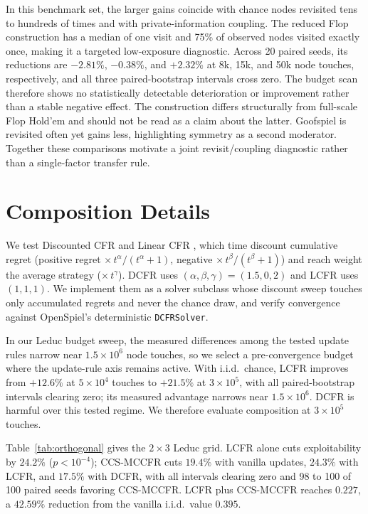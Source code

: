 \documentclass[11pt]{article}
\begin{document}
In this benchmark set, the larger gains coincide with chance nodes revisited tens to hundreds of times and with private-information coupling. The reduced Flop construction has a median of one visit and 75\% of observed nodes visited exactly once, making it a targeted low-exposure diagnostic. Across 20 paired seeds, its reductions are $-2.81\%$, $-0.38\%$, and $+2.32\%$ at 8k, 15k, and 50k node touches, respectively, and all three paired-bootstrap intervals cross zero. The budget scan therefore shows no statistically detectable deterioration or improvement rather than a stable negative effect. The construction differs structurally from full-scale Flop Hold'em and should not be read as a claim about the latter. Goofspiel is revisited often yet gains less, highlighting symmetry as a second moderator. Together these comparisons motivate a joint revisit/coupling diagnostic rather than a single-factor transfer rule.

\section{Composition Details}
\label{app:composition-details}

We test Discounted CFR and Linear CFR \citep{brown2019solving}, which time discount cumulative regret (positive regret $\times\, t^\alpha/(t^\alpha{+}1)$, negative $\times\, t^\beta/(t^\beta{+}1)$) and reach weight the average strategy ($\times\, t^\gamma$). DCFR uses $(\alpha,\beta,\gamma){=}(1.5,0,2)$ and LCFR uses $(1,1,1)$. We implement them as a solver subclass whose discount sweep touches only accumulated regrets and never the chance draw, and verify convergence against OpenSpiel's deterministic \texttt{DCFRSolver}.

In our Leduc budget sweep, the measured differences among the tested update rules narrow near $1.5\!\times\!10^6$ node touches, so we select a pre-convergence budget where the update-rule axis remains active. With i.i.d.\ chance, LCFR improves from $+12.6\%$ at $5\!\times\!10^4$ touches to $+21.5\%$ at $3\!\times\!10^5$, with all paired-bootstrap intervals clearing zero; its measured advantage narrows near $1.5\!\times\!10^6$. DCFR is harmful over this tested regime. We therefore evaluate composition at $3\!\times\!10^5$ touches.

Table~\ref{tab:orthogonal} gives the $2\times3$ Leduc grid. LCFR alone cuts exploitability by $24.2\%$ ($p{<}10^{-4}$); CCS-MCCFR cuts $19.4\%$ with vanilla updates, $24.3\%$ with LCFR, and $17.5\%$ with DCFR, with all intervals clearing zero and 98 to 100 of 100 paired seeds favoring CCS-MCCFR. LCFR plus CCS-MCCFR reaches $0.227$, a $42.59\%$ reduction from the vanilla i.i.d.\ value $0.395$.
\end{document}
